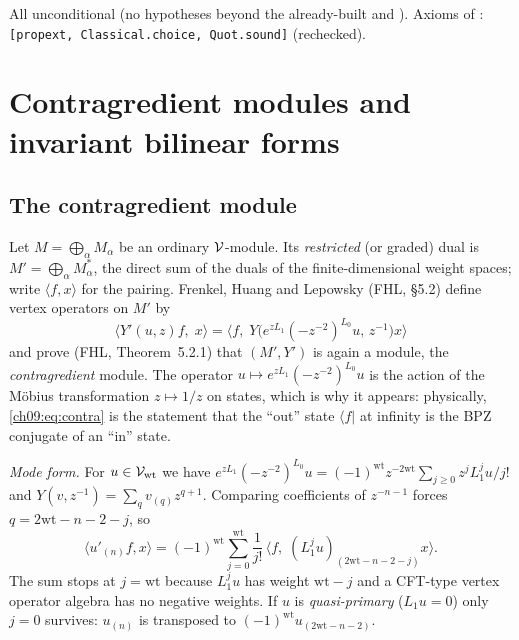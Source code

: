 \begin{status}
All unconditional (no hypotheses beyond the already-built  and
). Axioms of : \texttt{[propext, Classical.choice,
Quot.sound]} (rechecked).
\end{status}

\section{Contragredient modules and invariant bilinear forms}\label{ch09:sec:contra}

\subsection{The contragredient module}

Let $M=\bigoplus_\alpha M_\alpha$ be an ordinary $\mathcal{V}$-module. Its \emph{restricted} (or
graded) dual is $M'=\bigoplus_\alpha M_\alpha^*$, the direct sum of the duals of the
finite-dimensional weight spaces; write $\langle f,x\rangle$ for the pairing. Frenkel, Huang and
Lepowsky (FHL, \S5.2) define vertex operators on $M'$ by
\begin{equation}\label{ch09:eq:contra}
\big\langle Y'(u,z)f,\;x\big\rangle=\Big\langle f,\;Y\big(e^{zL_1}(-z^{-2})^{L_0}u,\,z^{-1}\big)x\Big\rangle
\end{equation}
and prove (FHL, Theorem~5.2.1) that $(M',Y')$ is again a module, the \emph{contragredient} module.
The operator $u\mapsto e^{zL_1}(-z^{-2})^{L_0}u$ is the action of the M\"obius transformation
$z\mapsto 1/z$ on states, which is why it appears: physically, \eqref{ch09:eq:contra} is the
statement that the ``out'' state $\langle f|$ at infinity is the BPZ conjugate of an ``in'' state.

\emph{Mode form.} For $u\in\mathcal{V}_{\mathrm{wt}}$ we have
$e^{zL_1}(-z^{-2})^{L_0}u=(-1)^{\mathrm{wt}}z^{-2\mathrm{wt}}\sum_{j\ge0}z^jL_1^ju/j!$ and
$Y(v,z^{-1})=\sum_qv_{(q)}z^{q+1}$. Comparing coefficients of $z^{-n-1}$ forces
$q=2\mathrm{wt}-n-2-j$, so
\begin{equation}\label{ch09:eq:contramode}
\big\langle u'_{(n)}f,x\big\rangle=(-1)^{\mathrm{wt}}\sum_{j=0}^{\mathrm{wt}}\frac1{j!}\,
\big\langle f,\;(L_1^ju)_{(2\mathrm{wt}-n-2-j)}x\big\rangle .
\end{equation}
The sum stops at $j=\mathrm{wt}$ because $L_1^ju$ has weight $\mathrm{wt}-j$ and a CFT-type vertex
operator algebra has no negative weights. If $u$ is \emph{quasi-primary} ($L_1u=0$) only $j=0$
survives: $u_{(n)}$ is transposed to $(-1)^{\mathrm{wt}}u_{(2\mathrm{wt}-n-2)}$.

